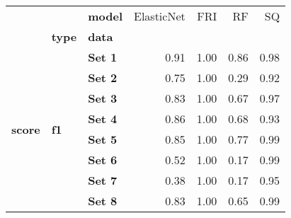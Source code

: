 \begin{tabular}{lllrrrr}
\toprule
      &    & \textbf{model} &  ElasticNet &  FRI &   RF &   SQ \\
{} & \textbf{type} & \textbf{data} &             &      &      &      \\
\midrule
\multirow{8}{*}{\textbf{score}} & \multirow{8}{*}{\textbf{f1}} & \textbf{Set 1} &        0.91 & 1.00 & 0.86 & 0.98 \\
      &    & \textbf{Set 2} &        0.75 & 1.00 & 0.29 & 0.92 \\
      &    & \textbf{Set 3} &        0.83 & 1.00 & 0.67 & 0.97 \\
      &    & \textbf{Set 4} &        0.86 & 1.00 & 0.68 & 0.93 \\
      &    & \textbf{Set 5} &        0.85 & 1.00 & 0.77 & 0.99 \\
      &    & \textbf{Set 6} &        0.52 & 1.00 & 0.17 & 0.99 \\
      &    & \textbf{Set 7} &        0.38 & 1.00 & 0.17 & 0.95 \\
      &    & \textbf{Set 8} &        0.83 & 1.00 & 0.65 & 0.99 \\
\bottomrule
\end{tabular}
